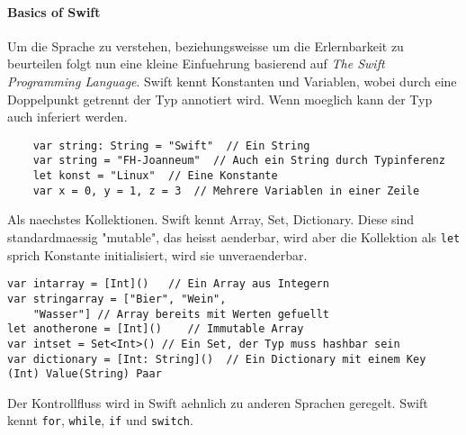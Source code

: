 \paragraph{Basics of Swift}
\label{para:basicsofswift}
Um die Sprache zu verstehen, beziehungsweisse um die Erlernbarkeit zu beurteilen folgt nun eine kleine Einfuehrung basierend auf \textit{The Swift Programming Language}\parencite{swiftbook}.
Swift kennt Konstanten und Variablen, wobei durch eine Doppelpunkt getrennt der Typ annotiert wird. Wenn moeglich kann der Typ auch inferiert werden.
\begin{lstlisting}
	var string: String = "Swift"  // Ein String
	var string = "FH-Joanneum"  // Auch ein String durch Typinferenz
 	let konst = "Linux"  // Eine Konstante
	var x = 0, y = 1, z = 3  // Mehrere Variablen in einer Zeile
\end{lstlisting}
Als naechstes Kollektionen. Swift kennt Array, Set, Dictionary. Diese sind standardmaessig "mutable", das heisst aenderbar, wird aber die Kollektion als \lstinline{let} sprich Konstante initialisiert, wird sie unveraenderbar.
\begin{lstlisting}
var intarray = [Int]()   // Ein Array aus Integern
var stringarray = ["Bier", "Wein", 
	"Wasser"] // Array bereits mit Werten gefuellt
let anotherone = [Int]()	// Immutable Array
var intset = Set<Int>()	// Ein Set, der Typ muss hashbar sein
var dictionary = [Int: String]()  // Ein Dictionary mit einem Key (Int) Value(String) Paar
\end{lstlisting}
Der Kontrollfluss wird in Swift aehnlich zu anderen Sprachen geregelt. Swift kennt \lstinline{for}, \lstinline{while}, \lstinline{if} und \lstinline{switch}.
